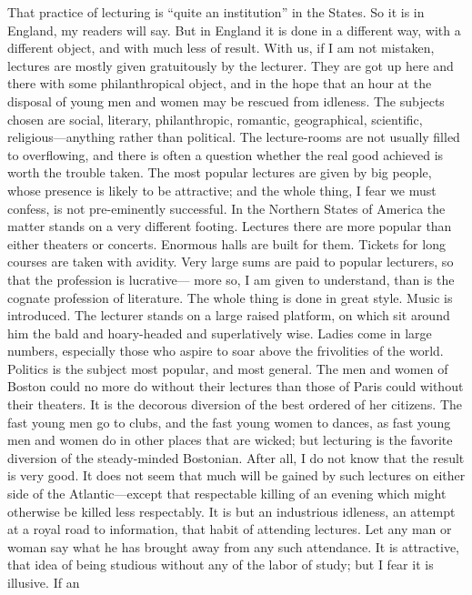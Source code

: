 That practice of lecturing is ``quite an institution'' in the States.
So it is in England, my readers will say.  But in England it is
done in a different way, with a different object, and with much
less of result.  With us, if I am not mistaken, lectures are mostly
given gratuitously by the lecturer.  They are got up here and there
with some philanthropical object, and in the hope that an hour at
the disposal of young men and women may be rescued from idleness.
The subjects chosen are social, literary, philanthropic, romantic,
geographical, scientific, religious---anything rather than
political.  The lecture-rooms are not usually filled to
overflowing, and there is often a question whether the real good
achieved is worth the trouble taken.  The most popular lectures are
given by big people, whose presence is likely to be attractive; and
the whole thing, I fear we must confess, is not pre-eminently
successful.  In the Northern States of America the matter stands on
a very different footing.  Lectures there are more popular than
either theaters or concerts.  Enormous halls are built for them.
Tickets for long courses are taken with avidity.  Very large sums
are paid to popular lecturers, so that the profession is lucrative---%
more so, I am given to understand, than is the cognate profession
of literature.  The whole thing is done in great style.  Music is
introduced.  The lecturer stands on a large raised platform, on
which sit around him the bald and hoary-headed and superlatively
wise.  Ladies come in large numbers, especially those who aspire to
soar above the frivolities of the world.  Politics is the subject
most popular, and most general.  The men and women of Boston could
no more do without their lectures than those of Paris could without
their theaters.  It is the decorous diversion of the best ordered
of her citizens.  The fast young men go to clubs, and the fast
young women to dances, as fast young men and women do in other
places that are wicked; but lecturing is the favorite diversion of
the steady-minded Bostonian.  After all, I do not know that the
result is very good.  It does not seem that much will be gained by
such lectures on either side of the Atlantic---except that
respectable killing of an evening which might otherwise be killed
less respectably.  It is but an industrious idleness, an attempt at
a royal road to information, that habit of attending lectures.  Let
any man or woman say what he has brought away from any such
attendance.  It is attractive, that idea of being studious without
any of the labor of study; but I fear it is illusive.  If an

